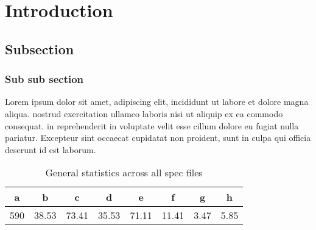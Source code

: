 \section{Introduction}

\subsection{Subsection}

\subsubsection{Sub sub section}
Lorem ipsum dolor sit amet,  adipiscing elit,  incididunt ut labore et dolore magna aliqua.  nostrud exercitation ullamco laboris nisi ut aliquip ex ea commodo consequat.  in reprehenderit in voluptate velit esse cillum dolore eu fugiat nulla pariatur. Excepteur sint occaecat cupidatat non proident, sunt in culpa qui officia deserunt id est laborum.

\begin{table}[!ht]
\caption{General statistics across all spec files}
\label{tab:general-spec-stats}
\centering
\begin{tabular}{c|c|c|c|c|c|c|c}
a     &b      &c      &d      &e      &f      &g      &h      \\ \hline
590   & 38.53 & 73.41 & 35.53 & 71.11 & 11.41 & 3.47  & 5.85  \\
\end{tabular}
\end{table}